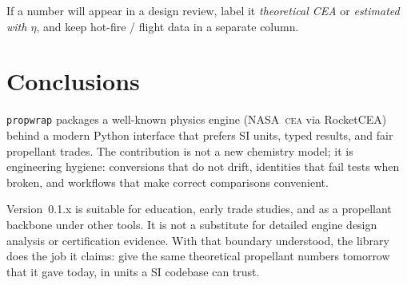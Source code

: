 \documentclass[11pt,a4paper]{report}
\newcommand{\pw}{\texttt{propwrap}}
\newcommand{\cea}{\textsc{cea}}
\begin{document}
If a number will appear in a design review, label it \emph{theoretical CEA} or
\emph{estimated with $\eta$}, and keep hot-fire / flight data in a separate
column.

\chapter{Conclusions}

\pw{} packages a well-known physics engine (NASA~\cea{} via RocketCEA) behind a
modern Python interface that prefers SI units, typed results, and fair
propellant trades. The contribution is not a new chemistry model; it is
engineering hygiene: conversions that do not drift, identities that fail tests
when broken, and workflows that make correct comparisons convenient.

Version~0.1.x is suitable for education, early trade studies, and as a
propellant backbone under other tools. It is not a substitute for detailed
engine design analysis or certification evidence. With that boundary understood,
the library does the job it claims: give the same theoretical propellant numbers
tomorrow that it gave today, in units a SI codebase can trust.
\end{document}
